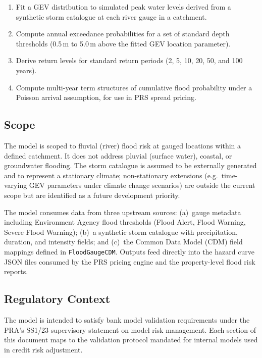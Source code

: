 \documentclass[11pt,a4paper]{article}
\begin{document}
\begin{enumerate}[label=(\roman*)]
    \item Fit a GEV distribution to simulated peak water levels derived from a synthetic storm catalogue at each river gauge in a catchment.
    \item Compute annual exceedance probabilities for a set of standard depth thresholds (0.5\,m to 5.0\,m above the fitted GEV location parameter).
    \item Derive return levels for standard return periods (2, 5, 10, 20, 50, and 100 years).
    \item Compute multi-year term structures of cumulative flood probability under a Poisson arrival assumption, for use in PRS spread pricing.
\end{enumerate}

\subsection{Scope}

The model is scoped to fluvial (river) flood risk at gauged locations within a defined catchment. It does not address pluvial (surface water), coastal, or groundwater flooding. The storm catalogue is assumed to be externally generated and to represent a stationary climate; non-stationary extensions (e.g.\ time-varying GEV parameters under climate change scenarios) are outside the current scope but are identified as a future development priority.

The model consumes data from three upstream sources: (a)~gauge metadata including Environment Agency flood thresholds (Flood Alert, Flood Warning, Severe Flood Warning); (b)~a synthetic storm catalogue with precipitation, duration, and intensity fields; and (c)~the Common Data Model (CDM) field mappings defined in \texttt{FloodGaugeCDM}. Outputs feed directly into the hazard curve JSON files consumed by the PRS pricing engine and the property-level flood risk reports.

\subsection{Regulatory Context}

The model is intended to satisfy bank model validation requirements under the PRA's SS1/23 supervisory statement on model risk management. Each section of this document maps to the validation protocol mandated for internal models used in credit risk adjustment.
\end{document}
